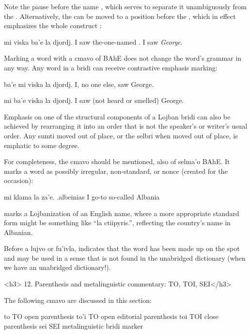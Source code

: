 Note the pause before the name , which serves to
    separate it unambiguously from the . Alternatively, the
     can be moved to a position before the , which in
    effect emphasizes the whole construct :
\begin{example}
mi viska ba'e la djordj.\n
I saw  the-one-named .\n
I saw \textit{George}.
\end{example}

Marking a word with a cmavo of BAhE does not change the word's
    grammar in any way. Any word in a bridi can receive contrastive
    emphasis marking:
\begin{example}
ba'e mi viska la djordj.\n
I, no one else, saw George.
\end{example}

\begin{example}
mi ba'e viska la djordj.\n
I saw (not heard or smelled) George.
\end{example}

Emphasis on one of the structural components of a Lojban
    bridi can also be achieved by rearranging it into an order that
    is not the speaker's or writer's usual order. Any sumti moved
    out of place, or the selbri when moved out of place, is
    emphatic to some degree.

For completeness, the cmavo  should be mentioned,
    also of selma'o BAhE. It marks a word as possibly irregular,
    non-standard, or nonce (created for the occasion):
\begin{example}
mi klama la za'e. .albeinias\n
I go-to so-called Albania
\end{example}

{\noindent}marks a Lojbanization of an English name, where a more
    appropriate standard form might be something like ``la
    ctiipyris.'', reflecting the country's name in Albanian. 

Before a lujvo or fu'ivla,  indicates that the word
    has been made up on the spot and may be used in a sense that is
    not found in the unabridged dictionary (when we have an
    unabridged dictionary!).

<h3>
12. Parenthesis and metalinguistic commentary: TO, TOI,
    SEI</h3>

The following cmavo are discussed in this section:

   to  TO  open parenthesis
    to'i    TO  open editorial parenthesis
    toi TOI close parenthesis
    sei SEI metalinguistic bridi marker

